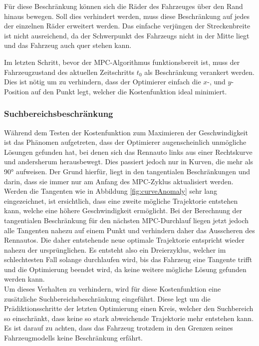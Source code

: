 \documentclass{like}
\begin{document}
Für diese Beschränkung können sich die Räder des Fahrzeuges über den Rand hinaus bewegen. Soll dies verhindert werden, muss diese Beschränkung auf jedes der einzelnen Räder erweitert werden. Das einfache verjüngen der Streckenbreite ist nicht ausreichend, da der Schwerpunkt des Fahrzeugs nicht in der Mitte liegt und das Fahrzeug auch quer stehen kann.

Im letzten Schritt, bevor der \ac{MPC}-Algorithmus funktionsbereit ist, muss der Fahrzeugzustand des aktuellen Zeitschritts $t_0$ als Beschränkung verankert werden.  Dies ist nötig um zu verhindern, dass der Optimierer einfach die \(x\)-, und \(y\)-Position auf den Punkt legt, welcher die Kostenfunktion ideal minimiert. 

\subsubsection*{Suchbereichsbeschränkung}
Während dem Testen der Kostenfunktion zum Maximieren der Geschwindigkeit ist das Phänomen aufgetreten, dass der Optimierer augenscheinlich unmögliche Lösungen gefunden hat, bei denen sich das Rennauto links aus einer Rechtskurve und andersherum herausbewegt. Dies passiert jedoch nur in Kurven, die mehr als 90° aufweisen. Der Grund hierfür, liegt in den tangentialen Beschränkungen und darin, dass sie immer nur am Anfang des \ac{MPC}-Zyklus aktualisiert werden. Werden die Tangenten wie in Abbildung \ref{fig:curveAnomaly} sehr lang eingezeichnet, ist ersichtlich, dass eine zweite mögliche Trajektorie entstehen kann, welche eine höhere Geschwindigkeit ermöglicht. Bei der Berechnung der tangentialen Beschränkung für den nächsten \ac{MPC}-Durchlauf liegen jetzt jedoch alle Tangenten nahezu auf einem Punkt und verhindern daher das Ausscheren des Rennautos. Die daher entstehende neue optimale Trajektorie entspricht wieder nahezu der ursprünglichen. Es entsteht also ein Dreierzyklus, welcher im schlechtesten Fall solange durchlaufen wird, bis das Fahrzeug eine Tangente trifft und die Optimierung beendet wird, da keine weitere mögliche Lösung gefunden werden kann.\\
Um dieses Verhalten zu verhindern, wird für diese Kostenfunktion eine zusätzliche Suchbereichsbeschränkung eingeführt. Diese legt um die Prädiktionsschritte der letzten Optimierung einen Kreis, welcher den Suchbereich so einschränkt, dass keine so stark abweichende Trajektorie mehr entstehen kann. Es ist darauf zu achten, dass das Fahrzeug trotzdem in den Grenzen seines Fahrzeugmodells keine Beschränkung erfährt. 
\end{document}
